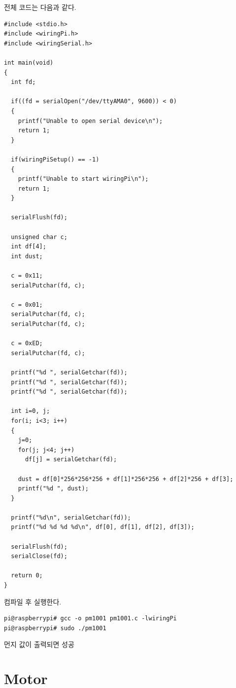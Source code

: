 \documentclass[11pt
  , a4paper
  , article
  , oneside
]{memoir}
\begin{document}
전체 코드는 다음과 같다.
\begin{lstlisting}[style=termstylenumber, caption={pm1001.c}, label={list:pm1001TestCode}]
#include <stdio.h>
#include <wiringPi.h>
#include <wiringSerial.h>

int main(void)
{
  int fd;

  if((fd = serialOpen("/dev/ttyAMA0", 9600)) < 0)
  {
    printf("Unable to open serial device\n");
    return 1;
  }

  if(wiringPiSetup() == -1)
  {
    printf("Unable to start wiringPi\n");
    return 1;
  }

  serialFlush(fd);

  unsigned char c;
  int df[4];
  int dust;

  c = 0x11;
  serialPutchar(fd, c);

  c = 0x01;
  serialPutchar(fd, c);
  serialPutchar(fd, c);

  c = 0xED;
  serialPutchar(fd, c);

  printf("%d ", serialGetchar(fd));
  printf("%d ", serialGetchar(fd));
  printf("%d ", serialGetchar(fd));

  int i=0, j;
  for(i; i<3; i++)
  {
    j=0;
    for(j; j<4; j++)
      df[j] = serialGetchar(fd);

    dust = df[0]*256*256*256 + df[1]*256*256 + df[2]*256 + df[3];
    printf("%d ", dust);
  }

  printf("%d\n", serialGetchar(fd));
  printf("%d %d %d %d\n", df[0], df[1], df[2], df[3]);

  serialFlush(fd);
  serialClose(fd);

  return 0;
}
\end{lstlisting}
컴파일 후 실행한다.
\begin{lstlisting}[style=termstyle]
pi@raspberrypi# gcc -o pm1001 pm1001.c -lwiringPi
pi@raspberrypi# sudo ./pm1001
\end{lstlisting}
먼지 값이 출력되면 성공
\section{Motor}
\end{document}
